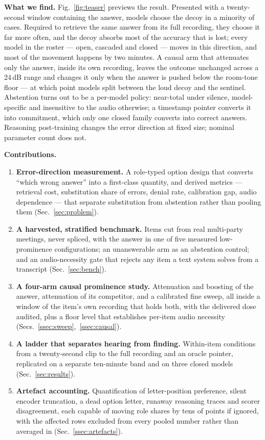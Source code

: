 \documentclass{article}
\begin{document}
\textbf{What we find.} Fig.~\ref{fig:teaser} previews the result. Presented
with a twenty-second window containing the answer, models choose the decoy
in a minority of cases. Required to retrieve the same answer from its full
recording, they choose it far more often, and the decoy absorbs most of the
accuracy that is lost; every model in the roster --- open, cascaded and
closed --- moves in this direction, and most of the movement happens by two
minutes. A causal arm that attenuates only the answer, inside its own
recording, leaves the outcome unchanged across a 24\,dB range and changes it
only when the answer is pushed below the room-tone floor --- at which point
models split between the loud decoy and the sentinel. Abstention turns out
to be a per-model policy: near-total under silence, model-specific and
insensitive to the audio otherwise; a timestamp pointer converts it into
commitment, which only one closed family converts into correct answers.
Reasoning post-training changes the error direction at fixed size; nominal
parameter count does not.

\noindent\textbf{Contributions.}
\begin{enumerate}\itemsep1.5pt \parskip0pt \leftskip-6pt
\item \textbf{Error-direction measurement.} A role-typed option design that
converts ``which wrong answer'' into a first-class quantity, and derived
metrics --- retrieval cost, substitution share of errors, denial rate,
calibration gap, audio dependence --- that separate substitution from
abstention rather than pooling them (Sec.~\ref{sec:problem}).
\item \textbf{A harvested, stratified benchmark.} Items cut from
real multi-party meetings, never spliced, with the answer in one of five
measured low-prominence configurations; an unanswerable arm as an abstention
control; and an audio-necessity gate that rejects any item a text
system solves from a transcript (Sec.~\ref{sec:bench}).
\item \textbf{A four-arm causal prominence study.} Attenuation and boosting of
the answer, attenuation of its competitor, and a calibrated fine sweep, all
inside a window of the item's own recording that holds both, with the
delivered dose audited, plus a floor level that establishes per-item audio
necessity (Secs.~\ref{ssec:sweep},~\ref{ssec:causal}).
\item \textbf{A ladder that separates hearing from finding.} Within-item
conditions from a twenty-second clip to the full recording and an oracle
pointer, replicated on a separate ten-minute band and on three closed
models (Sec.~\ref{sec:results}).
\item \textbf{Artefact accounting.} Quantification of letter-position
preference, silent encoder truncation, a dead option letter, runaway
reasoning traces and scorer disagreement, each capable of moving role shares
by tens of points if ignored, with the affected rows excluded from every
pooled number rather than averaged in (Sec.~\ref{ssec:artefacts}).
\end{enumerate}
\end{document}
